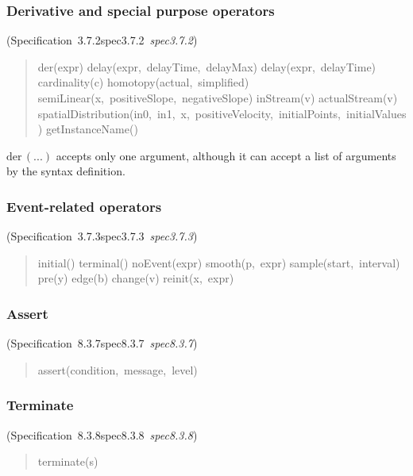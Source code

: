 \documentclass[10pt,b5paper]{article}
\def\specrefx#1#2{Specification~#1\ifx\relax#2\relax{}\else~{\it{}#2}\fi}
\def\specref#1{\specrefx{#1}{\csname spec#1\endcsname}}
\begin{document}
\subsubsection*{Derivative and special purpose operators}
(\specref{3.7.2}\/)

\begin{quote}\widespacing

der(expr)
delay(expr,~delayTime,~delayMax)
delay(expr,~delayTime)
cardinality(c)
homotopy(actual,~simplified)
semiLinear(x,~positiveSlope,~negativeSlope)
inStream(v)
actualStream(v)
spatialDistribution(in0,~in1,~x,~positiveVelocity,~initialPoints,~initialValues)
getInstanceName()

\end{quote}

\noindent $\mathrm{der}\,(...)$ accepts only one argument, although it
can accept a list of arguments by the syntax definition.

\subsubsection*{Event-related operators}
(\specref{3.7.3}\/)

\begin{quote}\widespacing

initial()
terminal()
noEvent(expr)
smooth(p,~expr)
sample(start,~interval)
pre(y)
edge(b)
change(v)
reinit(x,~expr)

\end{quote}

\subsubsection*{Assert}
(\specref{8.3.7}\/)

\begin{quote}\widespacing

assert(condition,~message,~level)

\end{quote}

\subsubsection*{Terminate}
(\specref{8.3.8}\/)

\begin{quote}\widespacing

terminate(s)

\end{quote}
\end{document}
